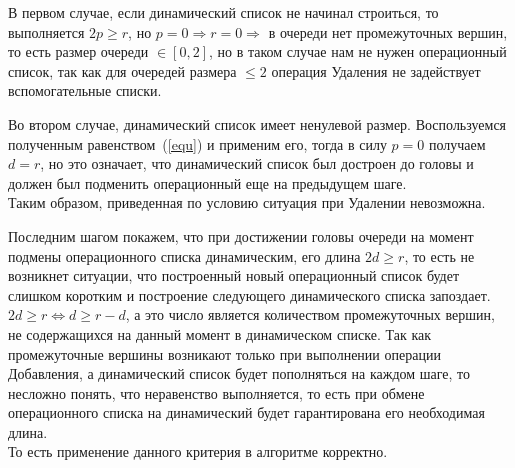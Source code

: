 \documentclass[a4paper,12pt]{extarticle}
\begin{document}
В первом случае, если динамический список не начинал строиться, то выполняется $2p \geqslant r$, но $p = 0 \Rightarrow r = 0 \Rightarrow$ в очереди нет промежуточных вершин, то есть размер очереди $\in [0, 2]$, но в таком случае нам не нужен операционный список, так как для очередей размера $\leqslant 2$ операция Удаления не задействует вспомогательные списки.\par
Во втором случае, динамический список имеет ненулевой размер. Воспользуемся полученным равенством~(\ref{equ}) и применим его, тогда в силу $p = 0$ получаем $d = r$, но это означает, что динамический список был достроен до головы и должен был подменить операционный еще на предыдущем шаге.\\
Таким образом, приведенная по условию ситуация при Удалении невозможна.\par
Последним шагом покажем, что при достижении головы очереди на момент подмены операционного списка динамическим, его длина $2d \geqslant r$, то есть не возникнет ситуации, что построенный новый операционный список будет слишком коротким и построение следующего динамического списка запоздает. $2d \geqslant r \Leftrightarrow d \geqslant r - d$, а это число является количеством промежуточных вершин, не содержащихся на данный момент в динамическом списке. Так как промежуточные вершины возникают только при выполнении операции Добавления, а динамический список будет пополняться на каждом шаге, то несложно понять, что неравенство выполняется, то есть при обмене операционного списка на динамический будет гарантирована его необходимая длина.\\
То есть применение данного критерия в алгоритме корректно.

\pagebreak
\end{document}
